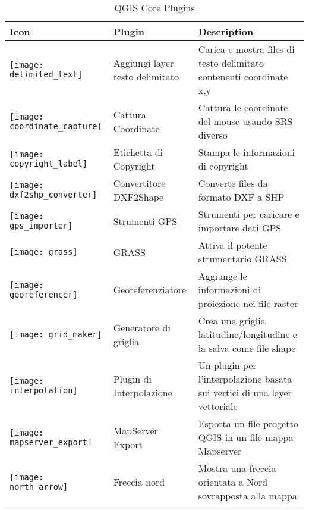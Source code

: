 \begin{minipage}{\textwidth}
\begin{table}[H]
\centering
\caption{QGIS Core Plugins}\label{tab:core_plugins}\medskip
\small
 \begin{tabular}{|l|l|p{4in}|}
\hline \textbf{Icon} & \textbf{Plugin} & \textbf{Description}\\
\hline
\texttt{[image: delimited\_text]}
 & Aggiungi layer testo delimitato \index{plugins!delimited text} & Carica e mostra files di testo delimitato contenenti coordinate x,y\\
\hline
\texttt{[image: coordinate\_capture]}
 & Cattura Coordinate \index{plugins!coordinate capture}& Cattura le coordinate del mouse
usando SRS diverso\\
\hline 
\texttt{[image: copyright\_label]}
 & Etichetta di Copyright \index{plugins!copyright}& Stampa le informazioni di copyright\\
\hline 
\texttt{[image: dxf2shp\_converter]}
 & Convertitore DXF2Shape \index{plugins!DXF2Shape}& Converte files da formato DXF a SHP\\
\hline
\texttt{[image: gps\_importer]}
 & Strumenti GPS \index{plugins!gps}& Strumenti per caricare e importare dati GPS\\
\hline
\texttt{[image: grass]}
 & GRASS \index{plugin!grass toolbox} & Attiva il potente strumentario GRASS\\
\hline
\texttt{[image: georeferencer]}
 & Georeferenziatore \index{plugin!georeferencer} & Aggiunge le informazioni di proiezione nei file raster\\
\hline
\texttt{[image: grid\_maker]}
 & Generatore di griglia \index{plugins!graticule}& Crea una griglia latitudine/longitudine e la salva come file shape\\
\hline
\texttt{[image: interpolation]}
& Plugin di Interpolazione \index{plugins!Interpolation}& Un plugin per l'interpolazione basata sui vertici di una layer vettoriale\\
\hline
\texttt{[image: mapserver\_export]}
& MapServer Export \index{plugins!MapServer Export}& Esporta un file progetto QGIS in un file mappa Mapserver \\
\hline
\texttt{[image: north\_arrow]}
& Freccia nord \index{plugins!north arrow}& Mostra una freccia orientata a Nord sovrapposta alla mappa \\

\end{tabular}
\end{table}
\end{minipage}
